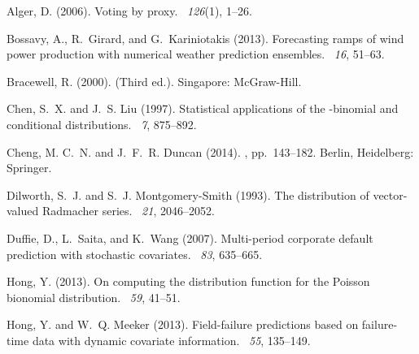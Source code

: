 \documentclass[12pt]{article}
\begin{document}
\begin{thebibliography}{}

Alger, D. (2006).
\newblock Voting by proxy.
~{\em 126\/}(1), 1--26.

Bossavy, A., R.~Girard, and G.~Kariniotakis (2013).
\newblock Forecasting ramps of wind power production with numerical weather
  prediction ensembles.
~{\em 16}, 51--63.

Bracewell, R. (2000).
 (Third ed.).
\newblock Singapore: McGraw-Hill.

Chen, S.~X. and J.~S. Liu (1997).
\newblock Statistical applications of the -binomial and
  conditional  distributions.
~{\em 7}, 875--892.

Cheng, M. C.~N. and J.~F.~R. Duncan (2014).
, pp.\  143--182.
\newblock Berlin, Heidelberg: Springer.

Dilworth, S.~J. and S.~J. Montgomery-Smith (1993).
\newblock The distribution of vector-valued {Radmacher} series.
~{\em 21}, 2046--2052.

Duffie, D., L.~Saita, and K.~Wang (2007).
\newblock Multi-period corporate default prediction with stochastic covariates.
~{\em 83}, 635--665.

Hong, Y. (2013).
\newblock On computing the distribution function for the {Poisson} bionomial
  distribution.
~{\em 59}, 41--51.

Hong, Y. and W.~Q. Meeker (2013).
\newblock Field-failure predictions based on failure-time data with dynamic
  covariate information.
~{\em 55}, 135--149.


\end{thebibliography}
\end{document}
